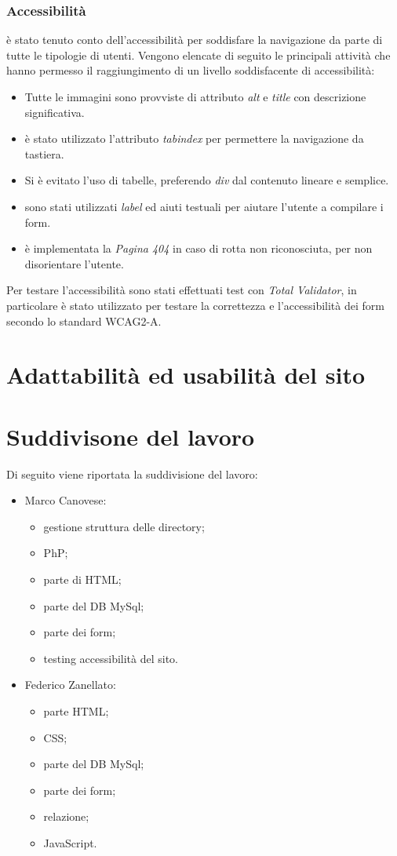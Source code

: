 \subsubsection{Accessibilità}
è stato tenuto conto dell'accessibilità per soddisfare la navigazione da parte di tutte le tipologie di utenti. Vengono elencate di seguito le principali attività che hanno permesso il raggiungimento di un livello soddisfacente di accessibilità:
\begin{itemize}
	\item Tutte le immagini sono provviste di attributo \textit{alt} e \textit{title} con descrizione significativa.
	\item è stato utilizzato l'attributo \textit{tabindex} per permettere la navigazione da tastiera.
	\item Si è evitato l'uso di tabelle, preferendo \textit{div}  dal contenuto lineare e semplice.
	\item sono stati utilizzati \textit{label} ed aiuti testuali per aiutare l'utente a compilare i form.
	\item è implementata la \textit{Pagina 404} in caso di rotta non riconosciuta, per non disorientare l'utente.
\end{itemize}
Per testare l'accessibilità sono stati effettuati test con \textit{Total Validator}, in particolare è stato utilizzato per testare la correttezza e l'accessibilità dei form secondo lo standard WCAG2-A.

\section{Adattabilità ed usabilità del sito}


\section{Suddivisone del lavoro}
Di seguito viene riportata la suddivisione del lavoro:
\begin{itemize}
	\item Marco Canovese:
	\begin{itemize}
		\item gestione struttura delle directory;
		\item PhP;
		\item parte di HTML;
		\item parte del DB MySql;
		\item parte dei form;
		\item testing accessibilità del sito.
	\end{itemize}
\end{itemize}

\begin{itemize}
	\item Federico Zanellato:
	\begin{itemize}
		\item parte HTML;
		\item CSS;
		\item parte del DB MySql;
		\item parte dei form;
		\item relazione;
		\item JavaScript.
	\end{itemize}
\end{itemize}

